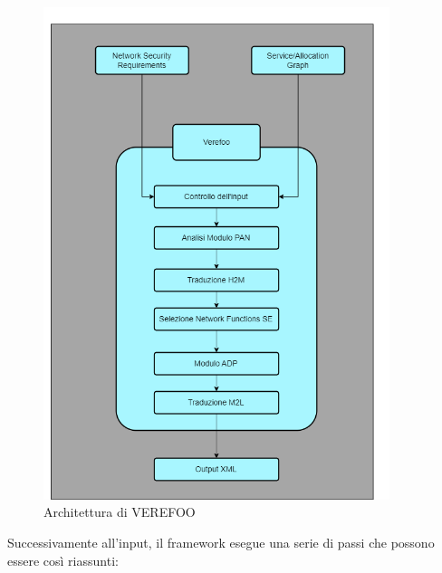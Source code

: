 \begin{figure}[H]  %
    \centering
    \includegraphics[width=0.9\textwidth]{VerefooArchitecture.png}  %
    \caption{Architettura di VEREFOO \cite{Bringhenti2019}}
    \label{fig:architettura_verefoo}
  \end{figure}
\newpage
Successivamente all'input, il framework esegue una serie di passi che possono essere così riassunti:

